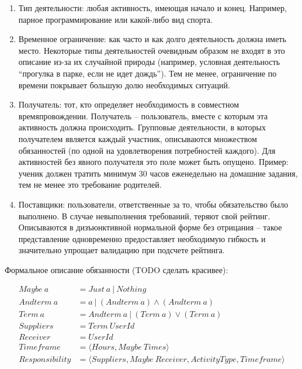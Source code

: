 \documentclass[]{itmo-student-thesis}
\begin{document}
\begin{enumerate}
\item Тип деятельности: любая активность, имеющая начало и
  конец. Например, парное программирование или какой-либо вид спорта.
\item Временное ограничение: как часто и как долго деятельность должна
  иметь место. Некоторые типы деятельностей очевидным образом не
  входят в это описание из-за их случайной природы (например, условная
  деятельность ``прогулка в парке, если не идет дождь''). Тем не
  менее, ограничение по времени покрывает большую долю необходимых
  ситуаций.
\item Получатель: тот, кто определяет необходимость в совместном
  времяпровождении. Получатель -- пользователь, вместе с которым эта
  активность должна происходить. Групповые деятельности, в которых
  получателем является каждый участник, описываются множеством
  обязанностей (по одной на удовлетворения потребностей каждого). Для
  активностей без явного получателя это поле может быть
  опущено. Пример: ученик должен тратить минимум 30 часов еженедельно
  на домашние задания, тем не менее это требование родителей.
\item Поставщики: пользователи, ответственные за то, чтобы
  обязательство было выполнено. В случае невыполнения требований,
  теряют свой рейтинг. Описываются в дизъюнктивной нормальной форме
  без отрицания -- такое представление одновременно предоставляет
  необходимую гибкость и значительно упрощает валидацию при подсчете
  рейтинга.
\end{enumerate}

Формальное описание обязанности (TODO сделать красивее):

\begin{align*}
Maybe \ a &= Just \ a \ | \ Nothing \\
Andterm \ a &= a \ | \ (Andterm \ a) \wedge (Andterm \ a) \\
Term \ a &= Andterm \ a \ | \ (Term \ a) \vee (Term \ a) \\
Suppliers &= Term \ UserId\\
Receiver &= UserId\\
Timeframe &= \langle Hours, Maybe \ Times \rangle\\
Responsibility &= \langle Suppliers, Maybe \ Receiver, ActivityType, Timeframe \rangle
\end{align*}
\end{document}
